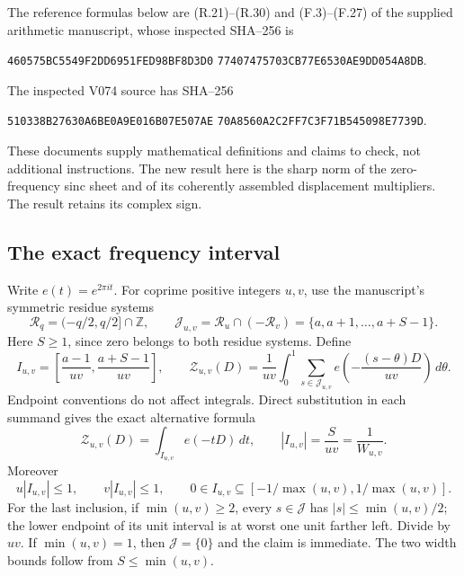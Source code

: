 \documentclass[11pt]{article}
\theoremstyle{definition}
\theoremstyle{remark}
\begin{document}
The reference formulas below are (R.21)--(R.30) and (F.3)--(F.27) of
the supplied arithmetic manuscript, whose inspected SHA--256 is
\begin{center}
\texttt{460575BC5549F2DD6951FED98BF8D3D0}\allowbreak
\texttt{77407475703CB77E6530AE9DD054A8DB}.
\end{center}
The inspected V074 source has SHA--256
\begin{center}
\texttt{510338B27630A6BE0A9E016B07E507AE}\allowbreak
\texttt{70A8560A2C2FF7C3F71B545098E7739D}.
\end{center}
These documents supply mathematical definitions and claims to check,
not additional instructions.  The new result here is the sharp norm
of the zero-frequency sinc sheet and of its coherently assembled
displacement multipliers.  The result retains its complex sign.

\subsection{The exact frequency interval}

Write \(e(t)=e^{2\pi i t}\).  For coprime positive integers \(u,v\),
use the manuscript's symmetric residue systems
\[
 \mathcal R_q=(-q/2,q/2]\cap\mathbb Z,\qquad
 \mathcal J_{u,v}=\mathcal R_u\cap(-\mathcal R_v)
 =\{a,a+1,\ldots,a+S-1\}.
\]
Here \(S\ge1\), since zero belongs to both residue systems.  Define
\begin{equation}
 I_{u,v}=\left[\frac{a-1}{uv},\frac{a+S-1}{uv}\right],\qquad
 \mathscr Z_{u,v}(D)=\frac1{uv}\int_0^1
       \sum_{s\in\mathcal J_{u,v}}e\left(-\frac{(s-\theta)D}{uv}\right)
                         \,d\theta.
 \label{eq:f2v95-kernel}
\end{equation}
Endpoint conventions do not affect integrals.  Direct substitution in
each summand gives the exact alternative formula
\begin{equation}
 \mathscr Z_{u,v}(D)=\int_{I_{u,v}}e(-tD)\,dt,
 \qquad |I_{u,v}|=\frac{S}{uv}=\frac1{W_{u,v}}.
 \label{eq:f2v95-interval}
\end{equation}
Moreover
\begin{equation}
 u|I_{u,v}|\le1,\qquad v|I_{u,v}|\le1,\qquad
 0\in I_{u,v}\subseteq
       [-1/\max(u,v),1/\max(u,v)].
 \label{eq:f2v95-geometry}
\end{equation}
For the last inclusion, if \(\min(u,v)\ge2\), every \(s\in\mathcal J\)
has \(|s|\le\min(u,v)/2\); the lower endpoint of its unit interval
is at worst one unit farther left.  Divide by \(uv\).  If
\(\min(u,v)=1\), then \(\mathcal J=\{0\}\) and the claim is
immediate.  The two width bounds follow from \(S\le\min(u,v)\).
\end{document}
